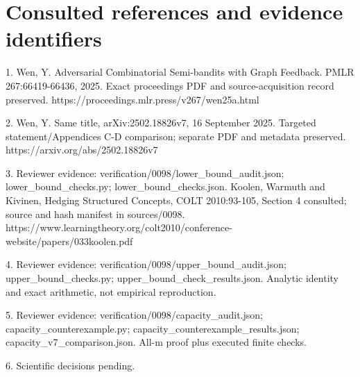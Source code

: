 \documentclass[10pt]{article}
\begin{document}
\section*{Consulted references and evidence identifiers}
1. Wen, Y. Adversarial Combinatorial Semi-bandits with Graph Feedback. PMLR 267:66419-66436, 2025. Exact proceedings PDF and source-acquisition record preserved. https://proceedings.mlr.press/v267/wen25a.html\par
2. Wen, Y. Same title, arXiv:2502.18826v7, 16 September 2025. Targeted statement/Appendices C-D comparison; separate PDF and metadata preserved. https://arxiv.org/abs/2502.18826v7\par
3. Reviewer evidence: verification/0098/lower\_bound\_audit.json; lower\_bound\_checks.py; lower\_bound\_checks.json. Koolen, Warmuth and Kivinen, Hedging Structured Concepts, COLT 2010:93-105, Section 4 consulted; source and hash manifest in sources/0098. https://www.learningtheory.org/colt2010/conference-website/papers/033koolen.pdf\par
4. Reviewer evidence: verification/0098/upper\_bound\_audit.json; upper\_bound\_checks.py; upper\_bound\_check\_results.json. Analytic identity and exact arithmetic, not empirical reproduction.\par
5. Reviewer evidence: verification/0098/capacity\_audit.json; capacity\_counterexample.py; capacity\_counterexample\_results.json; capacity\_v7\_comparison.json. All-m proof plus executed finite checks.\par
6. Scientific decisions pending.\par
\end{document}
